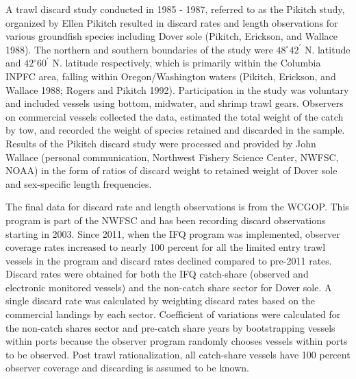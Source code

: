 \documentclass[11pt,
  english,
  a4paper,
]{article}
\begin{document}
\leavevmode\tagmcend\tagstructend\par


A trawl discard study conducted in 1985 - 1987, referred to as the Pikitch study, organized by Ellen Pikitch resulted in discard rates and length observations for various groundfish species including Dover sole {(Pikitch, Erickson, and Wallace 1988)\leavevmode\tagmcend\tagstructend}. The northern and southern boundaries of the study were {\(48^\circ 42^\prime\)\leavevmode\tagmcend\tagstructend} N. latitude and {\(42^\circ 60^\prime\)\leavevmode\tagmcend\tagstructend} N. latitude respectively, which is primarily within the Columbia INPFC area, falling within Oregon/Washington waters {(Pikitch, Erickson, and Wallace 1988; Rogers and Pikitch 1992)\leavevmode\tagmcend\tagstructend}. Participation in the study was voluntary and included vessels using bottom, midwater, and shrimp trawl gears. Observers on commercial vessels collected the data, estimated the total weight of the catch by tow, and recorded the weight of species retained and discarded in the sample. Results of the Pikitch discard study were processed and provided by John Wallace (personal communication, Northwest Fishery Science Center, NWFSC, NOAA) in the form of ratios of discard weight to retained weight of Dover sole and sex-specific length frequencies.

\leavevmode\tagmcend\tagstructend\par


The final data for discard rate and length observations is from the WCGOP. This program is part of the NWFSC and has been recording discard observations starting in 2003. Since 2011, when the IFQ program was implemented, observer coverage rates increased to nearly 100 percent for all the limited entry trawl vessels in the program and discard rates declined compared to pre-2011 rates. Discard rates were obtained for both the IFQ catch-share (observed and electronic monitored vessels) and the non-catch share sector for Dover sole. A single discard rate was calculated by weighting discard rates based on the commercial landings by each sector. Coefficient of variations were calculated for the non-catch shares sector and pre-catch share years by bootstrapping vessels within ports because the observer program randomly chooses vessels within ports to be observed. Post trawl rationalization, all catch-share vessels have 100 percent observer coverage and discarding is assumed to be known.
\end{document}
